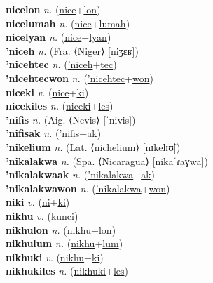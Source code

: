 \textbf{nicelon} \textit{n.} (\hyperref[nice]{nice}+\hyperref[lon]{lon})
 \label{nicelon} \\
\textbf{nicelumah} \textit{n.} (\hyperref[nice]{nice}+\hyperref[lumah]{lumah})
 \label{nicelumah} \\
\textbf{nicelyan} \textit{n.} (\hyperref[nice]{nice}+\hyperref[lyan]{lyan})
 \label{nicelyan} \\
\textbf{'niceh} \textit{n.} (Fra. ⟨Niger⟩ [niʒɛʁ])
 \label{'niceh} \\
\textbf{'nicehtec} \textit{n.} (\hyperref['niceh]{'niceh}+\hyperref[tec]{tec})
 \label{'nicehtec} \\
\textbf{'nicehtecwon} \textit{n.} (\hyperref['nicehtec]{'nicehtec}+\hyperref[won]{won})
 \label{'nicehtecwon} \\
\textbf{niceki} \textit{v.} (\hyperref[nice]{nice}+\hyperref[ki]{ki})
 \label{niceki} \\
\textbf{nicekiles} \textit{n.} (\hyperref[niceki]{niceki}+\hyperref[les]{les})
 \label{nicekiles} \\
\textbf{'nifis} \textit{n.} (Aig. ⟨Nevis⟩ [ˈnivis])
 \label{'nifis} \\
\textbf{'nifisak} \textit{n.} (\hyperref['nifis]{'nifis}+\hyperref[ak]{ak})
 \label{'nifisak} \\
\textbf{'nikelium} \textit{n.} (Lat. ⟨nichelium⟩ [nɪkelɪʊ̃])
 \label{'nikelium} \\
\textbf{'nikalakwa} \textit{n.} (Spa. ⟨Nicaragua⟩ [nikaˈɾaɣwa])
 \label{'nikalakwa} \\
\textbf{'nikalakwaak} \textit{n.} (\hyperref['nikalakwa]{'nikalakwa}+\hyperref[ak]{ak})
 \label{'nikalakwaak} \\
\textbf{'nikalakwawon} \textit{n.} (\hyperref['nikalakwa]{'nikalakwa}+\hyperref[won]{won})
 \label{'nikalakwawon} \\
\textbf{niki} \textit{v.} (\hyperref[ni]{ni}+\hyperref[ki]{ki})
 \label{niki} \\
\textbf{nikhu} \textit{v.} (\hyperref[kunci]{\sout{kunci}})
 \label{nikhu} \\
\textbf{nikhulon} \textit{n.} (\hyperref[nikhu]{nikhu}+\hyperref[lon]{lon})
 \label{nikhulon} \\
\textbf{nikhulum} \textit{n.} (\hyperref[nikhu]{nikhu}+\hyperref[lum]{lum})
 \label{nikhulum} \\
\textbf{nikhuki} \textit{v.} (\hyperref[nikhu]{nikhu}+\hyperref[ki]{ki})
 \label{nikhuki} \\
\textbf{nikhukiles} \textit{n.} (\hyperref[nikhuki]{nikhuki}+\hyperref[les]{les})
